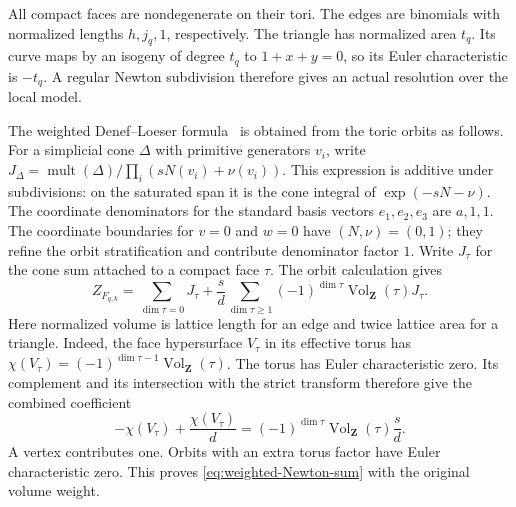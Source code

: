\documentclass[11pt]{article}
\numberwithin{equation}{section}
\theoremstyle{definition}
\theoremstyle{remark}
\newcommand{\ZZ}{\mathbf Z}
\DeclareMathOperator{\mult}{mult}
\begin{document}
All compact faces are nondegenerate on their tori.
The edges are binomials with normalized lengths
$h,j_q,1$, respectively. The triangle has normalized
area $t_q$. Its curve maps by an isogeny of degree
$t_q$ to $1+x+y=0$, so its Euler characteristic is
$-t_q$. A regular Newton subdivision therefore gives
an actual resolution over the local model.

The weighted Denef--Loeser formula~\cite{DL92} is obtained
from the toric orbits as follows.
For a simplicial cone $\Delta$ with primitive generators
$v_i$, write
$J_\Delta=\mult(\Delta)/\prod_i(sN(v_i)+\nu(v_i))$.
This expression is additive under subdivisions: on
the saturated span it is the cone integral of
$\exp(-sN-\nu)$. The coordinate denominators for the
standard basis vectors $e_1,e_2,e_3$ are $a,1,1$.
The coordinate boundaries for $v=0$ and $w=0$ have
$(N,\nu)=(0,1)$; they refine the orbit stratification
and contribute denominator factor $1$.
Write $J_\tau$ for the cone sum attached to a compact
face $\tau$. The orbit calculation gives
\begin{equation}\label{eq:weighted-Newton-sum}
 Z_{F_{q,k}}=\sum_{\dim\tau=0}J_\tau
       +\frac{s}{d}\sum_{\dim\tau\ge1}
          (-1)^{\dim\tau}\operatorname{Vol}_{\ZZ}(\tau)J_\tau.
\end{equation}
Here normalized volume is lattice length for an edge
and twice lattice area for a triangle. Indeed, the face
hypersurface $V_\tau$ in its effective torus has
$\chi(V_\tau)=(-1)^{\dim\tau-1}\operatorname{Vol}_{\ZZ}(\tau)$.
The torus has Euler characteristic zero. Its complement
and its intersection with the strict transform therefore
give the combined coefficient
\[
 -\chi(V_\tau)+\frac{\chi(V_\tau)}d
    =(-1)^{\dim\tau}\operatorname{Vol}_{\ZZ}(\tau)\frac{s}{d}.
\]
A vertex contributes one. Orbits with an extra torus
factor have Euler characteristic zero. This proves
\eqref{eq:weighted-Newton-sum} with the original
volume weight.
\end{document}
